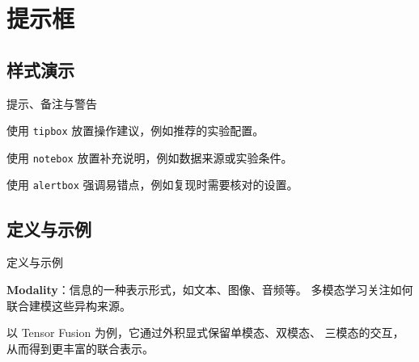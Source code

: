 \section{提示框}
\subsection{样式演示}

\begin{frame}{提示、备注与警告}
      \begin{tipbox}[提示]
            使用 \texttt{tipbox} 放置操作建议，例如推荐的实验配置。
      \end{tipbox}

      \begin{notebox}[备注]
            使用 \texttt{notebox} 放置补充说明，例如数据来源或实验条件。
      \end{notebox}

      \begin{alertbox}[警告]
            使用 \texttt{alertbox} 强调易错点，例如复现时需要核对的设置。
      \end{alertbox}
\end{frame}



\subsection{定义与示例}

\begin{frame}{定义与示例}
      \begin{definitionbox}[定义]
            \textbf{Modality}：信息的一种表示形式，如文本、图像、音频等。
            多模态学习关注如何联合建模这些异构来源。
      \end{definitionbox}

      \begin{examplebox}[示例]
            以 Tensor Fusion 为例，它通过外积显式保留单模态、双模态、
            三模态的交互，从而得到更丰富的联合表示。
      \end{examplebox}

\end{frame}

